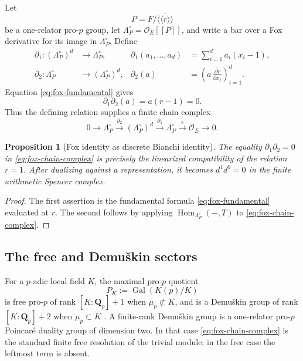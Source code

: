 \documentclass[11pt]{article}
\newtheorem{proposition}[theorem]{Proposition}
\theoremstyle{definition}
\newcommand{\Qp}{\mathbf Q_p}
\newcommand{\Gal}{\operatorname{Gal}}
\begin{document}
Let
\[
P=F/\overline{\langle\!\langle r\rangle\!\rangle}
\]
be a one-relator pro-$p$ group, let $\Lambda_P^\circ=\mathcal O_E[[P]]$, and write a bar over a Fox derivative for its image in $\Lambda_P^\circ$.  Define
\begin{align}
\partial_1:(\Lambda_P^\circ)^d&\longrightarrow\Lambda_P^\circ,
&
\partial_1(a_1,\ldots,a_d)
&=\sum_{i=1}^{d}a_i(x_i-1),\label{eq:fox-boundary1}\\
\partial_2:\Lambda_P^\circ&\longrightarrow(\Lambda_P^\circ)^d,
&
\partial_2(a)
&=\left(a\,\overline{\frac{\partial r}{\partial x_i}}\right)_{i=1}^{d}.
\label{eq:fox-boundary2}
\end{align}
Equation \eqref{eq:fox-fundamental} gives
\[
\partial_1\partial_2(a)=a(r-1)=0.
\]
Thus the defining relation supplies a finite chain complex
\begin{equation}\label{eq:fox-chain-complex}
0\longrightarrow\Lambda_P^\circ
\xrightarrow{\partial_2}
(\Lambda_P^\circ)^d
\xrightarrow{\partial_1}
\Lambda_P^\circ
\xrightarrow{\epsilon}
\mathcal O_E
\longrightarrow0.
\end{equation}

\begin{proposition}[Fox identity as discrete Bianchi identity]\label{prop:fox-bianchi}
The equality $\partial_1\partial_2=0$ in \eqref{eq:fox-chain-complex} is precisely the linearized compatibility of the relation $r=1$.  After dualizing against a representation, it becomes $d^1d^0=0$ in the finite arithmetic Spencer complex.
\end{proposition}

\begin{proof}
The first assertion is the fundamental formula \eqref{eq:fox-fundamental} evaluated at $r$.  The second follows by applying $\operatorname{Hom}_{\Lambda_P^\circ}(-,T)$ to \eqref{eq:fox-chain-complex}.
\end{proof}

\subsection{The free and Demu\v{s}kin sectors}

For a $p$-adic local field $K$, the maximal pro-$p$ quotient
\[
P_K:=\Gal(K(p)/K)
\]
is free pro-$p$ of rank $[K:\Qp]+1$ when $\mu_p\not\subset K$, and is a Demu\v{s}kin group of rank $[K:\Qp]+2$ when $\mu_p\subset K$ \cite{JardenShusterman,NSW}.  A finite-rank Demu\v{s}kin group is a one-relator pro-$p$ Poincar\'e duality group of dimension two.  In that case \eqref{eq:fox-chain-complex} is the standard finite free resolution of the trivial module; in the free case the leftmost term is absent.
\end{document}
